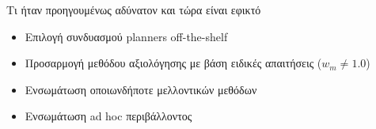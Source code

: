 \begin{frame}{Τι ήταν προηγουμένως αδύνατον και τώρα είναι εφικτό}

  \begin{itemize}
    \item Επιλογή συνδυασμού planners off-the-shelf
    \item Προσαρμογή μεθόδου αξιολόγησης με βάση ειδικές απαιτήσεις ($w_m \neq 1.0$)
    \item Ενσωμάτωση οποιωνδήποτε μελλοντικών μεθόδων
    \item Ενσωμάτωση ad hoc περιβάλλοντος
  \end{itemize}

\end{frame}
